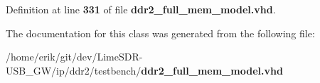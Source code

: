 Definition at line {\bf 331} of file {\bf ddr2\+\_\+full\+\_\+mem\+\_\+model.\+vhd}.



The documentation for this class was generated from the following file\+:\begin{DoxyCompactItemize}
\item 
/home/erik/git/dev/\+Lime\+S\+D\+R-\/\+U\+S\+B\+\_\+\+G\+W/ip/ddr2/testbench/{\bf ddr2\+\_\+full\+\_\+mem\+\_\+model.\+vhd}\end{DoxyCompactItemize}
